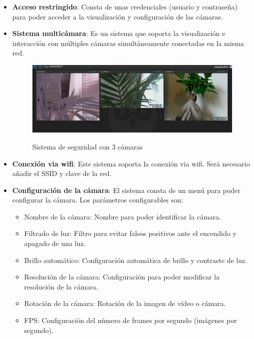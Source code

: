 \vspace{-0.5cm}

\begin{itemize}
\item \textbf{Acceso restringido}: Consta de unas credenciales (usuario y contraseña) para poder acceder a la visualización y configuración de las cámaras.

\item \textbf{Sistema multicámara}: Es un sistema que soporta la visualización e interacción con múltiples cámaras simultáneamente conectadas en la misma red.

\begin{figure}[h]
	\centering
	\includegraphics[scale=0.4]{images/1}
	\label{imagen2}
	\caption{Sistema de seguridad con 3 cámaras}
\end{figure}

\item \textbf{Conexión via wifi}: Este sistema soporta la conexión via wifi. Será necesario añadir el SSID y clave de la red.

\item \textbf{Configuración de la cámara}: El sistema consta de un menú para poder configurar la cámara. Los parámetros configurables son:

	\begin{itemize}
	\item Nombre de la cámara: Nombre para poder identificar la cámara.
	\item Filtrado de luz: Filtro para evitar falsos positivos ante el encendido y apagado de una luz.
	\item Brillo automático: Configuración automática de brillo y contraste de luz.
	\item Resolución de la cámara: Configuración para poder modificar la resolución de la cámara.
	\item Rotación de la cámara: Rotación de la imagen de vídeo o cámara.
	\item FPS: Configuración del número de frames por segundo (imágenes por segundo).
	\end{itemize}


\end{itemize}
